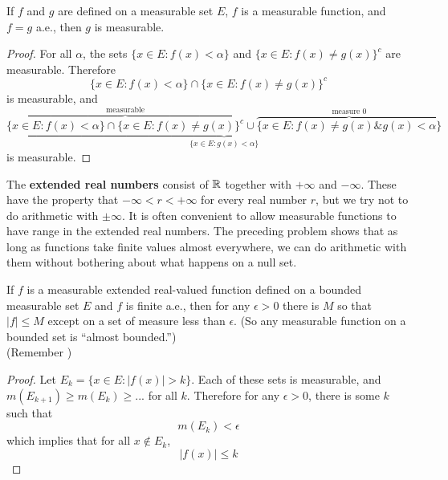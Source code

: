 \begin{pblm}%
	If $f$ and $g$ are defined on a measurable set $E$, $f$ is a measurable 
	function, and $f = g$ a.e., then $g$ is measurable. 
\begin{proof}
	For all $\alpha$, the sets $\{x \in E: f(x) < \alpha\}$ and 
	$\{x \in E: f(x) \neq g(x)\}^c$ are measurable. Therefore 
	\begin{equation*}
		\{x \in E: f(x) < \alpha\} \cap \{x \in E: f(x) \neq g(x)\}^c
	\end{equation*}
	is measurable, and 
	\begin{equation*}
		\underbrace{ 
			\overbrace{\{x \in E: f(x) < \alpha\}\cap\{x \in E: f(x) \neq g(x)\}^c}^{\text{measurable}} 
			\cup \overbrace{\{x \in E: f(x) \neq g(x) \& g(x) < \alpha \}}^{\text{measure }0}
		}_{\{x \in E: g(x) < \alpha\}}
	\end{equation*}
	is measurable. 
\end{proof}
\end{pblm}

\begin{defn}\label{d:extendedreals}%
	The \textbf{extended real numbers} consist of $\mathbb{R}$ together with $+\infty$ 
	and $-\infty$. These have the property that $-\infty < r < +\infty$ for 
	every real number $r$, but we try not to do arithmetic with $\pm\infty$. It 
	is often convenient to allow measurable functions to have range in the 
	extended real numbers. The preceding problem shows that as long as 
	functions take finite values almost everywhere, we can do arithmetic with 
	them without bothering about what happens on a null set. 
\end{defn}

\begin{pblm}%
	If $f$ is a measurable extended real-valued function defined on a bounded 
	measurable set $E$ and $f$ is finite a.e., then for any $\epsilon > 0$ 
	there is $M$ so that $|f| \le M$ except on a set of measure less than 
	$\epsilon$. (So any measurable function on a bounded set is ``almost 
	bounded.'') \\ (Remember )
\begin{proof}
	Let $E_k = \{x \in E: |f(x)| > k\}$. Each of these sets is 
	measurable, and $m(E_{k+1}) \ge m(E_k) \ge ...$ for all $k$. Therefore 
	for any $\epsilon > 0$, there is some $k$ such that 
	\begin{equation*}
		m(E_k) < \epsilon
	\end{equation*}
	which implies that for all $x \notin E_k$, 
	\begin{equation*}
		|f(x)| \le k
	\end{equation*}
\end{proof}
\end{pblm}

